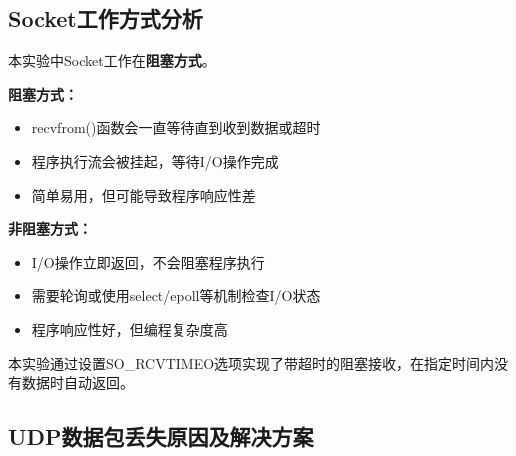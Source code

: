 \documentclass[a4paper]{article}
\begin{document}
\subsection{Socket工作方式分析}

本实验中Socket工作在\textbf{阻塞方式}。

\textbf{阻塞方式：}
\begin{itemize}
    \item recvfrom()函数会一直等待直到收到数据或超时
    \item 程序执行流会被挂起，等待I/O操作完成
    \item 简单易用，但可能导致程序响应性差
\end{itemize}

\textbf{非阻塞方式：}
\begin{itemize}
    \item I/O操作立即返回，不会阻塞程序执行
    \item 需要轮询或使用select/epoll等机制检查I/O状态
    \item 程序响应性好，但编程复杂度高
\end{itemize}

本实验通过设置SO\_RCVTIMEO选项实现了带超时的阻塞接收，在指定时间内没有数据时自动返回。

\subsection{UDP数据包丢失原因及解决方案}
\end{document}

